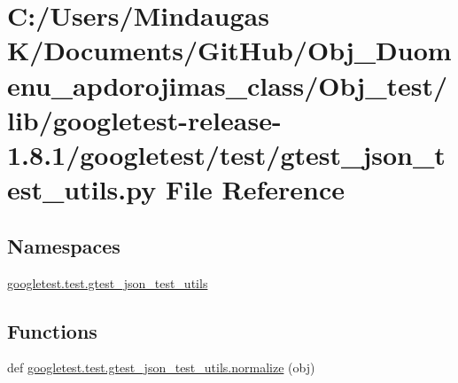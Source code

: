 \hypertarget{_obj__test_2lib_2googletest-release-1_88_81_2googletest_2test_2gtest__json__test__utils_8py}{}\section{C\+:/\+Users/\+Mindaugas K/\+Documents/\+Git\+Hub/\+Obj\+\_\+\+Duomenu\+\_\+apdorojimas\+\_\+class/\+Obj\+\_\+test/lib/googletest-\/release-\/1.8.1/googletest/test/gtest\+\_\+json\+\_\+test\+\_\+utils.py File Reference}
\label{_obj__test_2lib_2googletest-release-1_88_81_2googletest_2test_2gtest__json__test__utils_8py}
\subsection*{Namespaces}
\begin{DoxyCompactItemize}
\item 
 \mbox{\hyperlink{namespacegoogletest_1_1test_1_1gtest__json__test__utils}{googletest.\+test.\+gtest\+\_\+json\+\_\+test\+\_\+utils}}
\end{DoxyCompactItemize}
\subsection*{Functions}
\begin{DoxyCompactItemize}
\item 
def \mbox{\hyperlink{namespacegoogletest_1_1test_1_1gtest__json__test__utils_a707a076db5247498f0620829ac91f186}{googletest.\+test.\+gtest\+\_\+json\+\_\+test\+\_\+utils.\+normalize}} (obj)
\end{DoxyCompactItemize}
